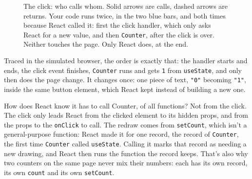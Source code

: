 \begin{figure}[htbp]
\caption{The click: who calls whom. Solid arrows are calls, dashed arrows are
returns. Your code runs twice, in the two blue bars, and both times because
React called it: first the click handler, which only asks React for a new
value, and then \texttt{Counter}, after the click is over. Neither touches the
page. Only React does, at the end.}
\label{fig:react-change}
\end{figure}

Traced in the simulated browser, the order is exactly that: the handler starts
and ends, the click event finishes, \texttt{Counter} runs and gets \texttt{1}
from \texttt{useState}, and only then does the page change. It changes once:
one piece of text, \texttt{"0"} becoming \texttt{"1"}, inside the same button
element, which React kept instead of building a new one.

\begin{question}{How does React know it has to call Counter, of all functions?}
Not from the click. The click only leads React from the clicked element to its
hidden props, and from the props to the \texttt{onClick} to call. The redraw
comes from \texttt{setCount}, which isn't a general-purpose function: React made
it for one record, the record of \texttt{Counter}, the first time
\texttt{Counter} called \texttt{useState}. Calling it marks that record as
needing a new drawing, and React then runs the function the record keeps.
That's also why two counters on the same page never mix their numbers: each has
its own record, its own \texttt{count} and its own \texttt{setCount}.
\end{question}

